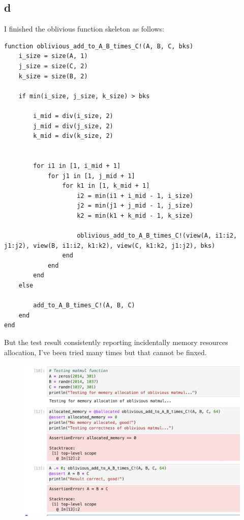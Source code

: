 \documentclass{article}
\begin{document}
\subsection{d}
I finished the oblivious function skeleton as follows:
\begin{verbatim}
function oblivious_add_to_A_B_times_C!(A, B, C, bks)
    i_size = size(A, 1)
    j_size = size(C, 2)
    k_size = size(B, 2)

    if min(i_size, j_size, k_size) > bks
        
        i_mid = div(i_size, 2)
        j_mid = div(j_size, 2)
        k_mid = div(k_size, 2)

        
        for i1 in [1, i_mid + 1]
            for j1 in [1, j_mid + 1]
                for k1 in [1, k_mid + 1]
                    i2 = min(i1 + i_mid - 1, i_size)
                    j2 = min(j1 + j_mid - 1, j_size)
                    k2 = min(k1 + k_mid - 1, k_size)
                  
                    oblivious_add_to_A_B_times_C!(view(A, i1:i2, j1:j2), view(B, i1:i2, k1:k2), view(C, k1:k2, j1:j2), bks)
                end
            end
        end
    else
       
        add_to_A_B_times_C!(A, B, C)
    end
end
\end{verbatim}
But the test result consistently reporting incidentally memory resources allocation, I've been tried many times but that cannot be finxed.
\begin{figure}[H]
    \centering
    \includegraphics[width=0.8\linewidth]{Photos/Image 2-6-24 at 11.33.jpeg}
\end{figure}
\end{document}
